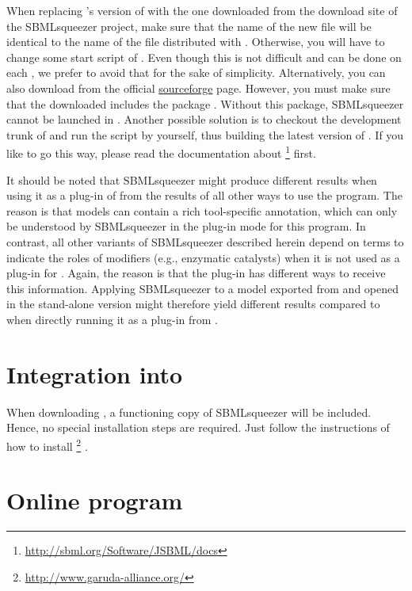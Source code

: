 When replacing \CellDesigner's version of \JSBML with the one downloaded from the download site of the SBMLsqueezer project, 
make sure that the name of the new \JSBML file will be identical to the name of the \JSBML file distributed with \CellDesigner.
Otherwise, you will have to change some start script of \CellDesigner.
Even though this is not difficult and can be done on each \OS, we prefer to avoid that for the sake of simplicity.
Alternatively, you can also download \JSBML from the official \href{http://sourceforge.net/projects/jsbml/}{sourceforge} page.
However, you must make sure that the downloaded \JAR includes the package .
Without this package, SBMLsqueezer cannot be launched in \CellDesigner.
Another possible solution is to checkout the development trunk of \JSBML and run the \ant script by yourself, thus building the latest version of \JSBML.
If you like to go this way, please read the documentation about \JSBML\footnote{\url{http://sbml.org/Software/JSBML/docs}} first.

It should be noted that SBMLsqueezer might produce different results when using it as a plug-in of \CellDesigner from the results of all other ways to use the program.
The reason is that \CellDesigner models can contain a rich tool-specific annotation, which can only be understood by SBMLsqueezer in the plug-in mode for this program.
In contrast, all other variants of SBMLsqueezer described herein depend on \SBO terms to indicate the roles of modifiers (e.g., enzymatic catalysts) when it is not used as a plug-in for \CellDesigner.
Again, the reason is that the \CellDesigner plug-in has different ways to receive this information.
Applying SBMLsqueezer to a model exported from \CellDesigner and opened in the stand-alone version might therefore yield different results compared to when directly running it as a plug-in from \CellDesigner.


\section{Integration into \Garuda}
\label{sec:GarudaInstall}

When downloading \Garuda, a functioning copy of SBMLsqueezer will be included.
Hence, no special installation steps are required. Just follow the instructions
of how to install \Garuda\footnote{\url{http://www.garuda-alliance.org/}} \citep{Ghosh2011}.

\section{Online program}
\label{sec:WebserviceInstallation}

